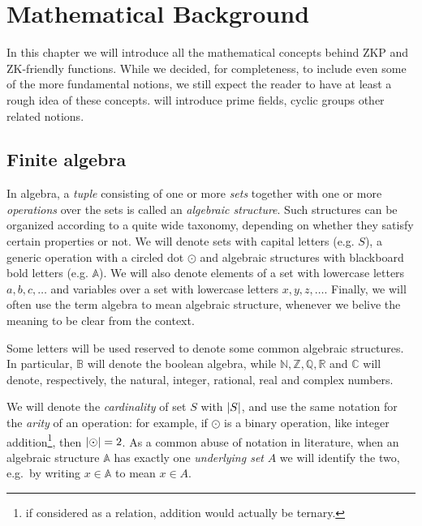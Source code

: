 \chapter{Mathematical Background}
In this chapter we will introduce all the mathematical concepts behind ZKP and ZK-friendly 
functions.
While we decided, for completeness, to include even some of the more fundamental notions, we still
expect the reader to have at least a rough idea of these concepts.
 will introduce prime fields, cyclic groups other related notions.  

\section{Finite algebra}\label{sec:prime_fields}
In algebra, a \emph{tuple} consisting of one or more \emph{sets} together with one or more 
\emph{operations} over the sets is called an \emph{algebraic structure}.
Such structures can be organized according to a quite wide taxonomy, depending on whether 
they satisfy certain properties or not. 
We will denote sets with capital letters (e.g. \(S\)), a generic operation with a circled dot 
\(\odot \) and algebraic structures with blackboard bold letters (e.g. \(\mathbb{A}\)).
We will also denote elements of a set with lowercase letters \(a, b, c, \dots \) and variables 
over a set with lowercase letters \(x, y, z, \dots \).
Finally, we will often use the term algebra to mean algebraic structure, whenever we belive the 
meaning to be clear from the context.
\begin{remark}
  Some letters will be used reserved to denote some common algebraic structures. 
  In particular, \(\mathbb{B}\) will denote the boolean algebra, while \(\mathbb{N}, \mathbb{Z}, 
  \mathbb{Q}, \mathbb{R}\) and \(\mathbb{C}\) will denote, respectively, the 
  natural, integer, rational, real and complex numbers.
\end{remark}

We will denote the \emph{cardinality} of set \(S\) with \(\left\lvert S\right\rvert\), and use the same notation for 
the \emph{arity} of an operation: for example, if \(\odot \) is a binary operation, like integer 
addition\footnote{if considered as a relation, addition would actually be ternary.}, then 
\(\left\lvert\odot\right\rvert = 2\).
As a common abuse of notation in literature, when an algebraic structure \(\mathbb{A}\) has exactly 
one \emph{underlying set} \(A\) we will identify the two, e.g.\ by writing \(x \in \mathbb{A}\) to 
mean \(x \in A\).

